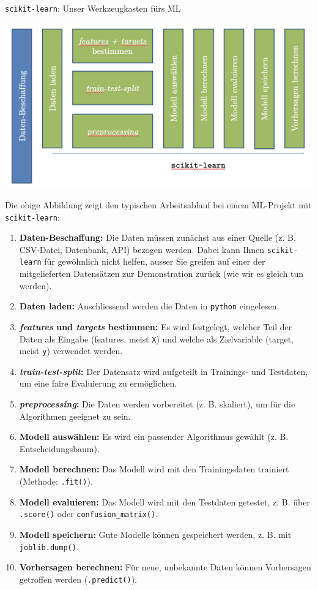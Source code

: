 \begin{lpu}{\texttt{scikit-learn}: Unser Werkzeugkasten fürs ML}
\vspace{1em}
\begin{center}
  \includegraphics[width=0.9\linewidth]{pipeline.png}
\end{center}

Die obige Abbildung zeigt den typischen Arbeitsablauf bei einem ML-Projekt mit \texttt{scikit-learn}:

\begin{enumerate}
  \item \textbf{Daten-Beschaffung:} Die Daten müssen zunächst aus einer Quelle (z. B. CSV-Datei, Datenbank, API) bezogen werden. Dabei kann Ihnen \texttt{scikit-learn} für gewöhnlich nicht helfen, ausser Sie greifen auf einer der mitgelieferten Datensätzen zur Demonstration zurück (wie wir es gleich tun werden).
  \item \textbf{Daten laden:} Anschliessend werden die Daten in \texttt{python} eingelesen.
  \item \textbf{\textit{features} und \textit{targets} bestimmen:} Es wird festgelegt, welcher Teil der Daten als Eingabe (features, meist \texttt{X}) und welche als Zielvariable (target, meist \texttt{y}) verwendet werden.
  \item \textbf{\textit{train-test-split}:} Der Datensatz wird aufgeteilt in Trainings- und Testdaten, um eine faire Evaluierung zu ermöglichen.
  \item \textbf{\textit{preprocessing}:} Die Daten werden vorbereitet (z. B. skaliert), um für die Algorithmen geeignet zu sein.
  \item \textbf{Modell auswählen:} Es wird ein passender Algorithmus gewählt (z. B. Entscheidungsbaum).
  \item \textbf{Modell berechnen:} Das Modell wird mit den Trainingsdaten trainiert (Methode: \texttt{.fit()}).
  \item \textbf{Modell evaluieren:} Das Modell wird mit den Testdaten getestet, z. B. über \texttt{.score()} oder \texttt{confusion\_matrix()}.
  \item \textbf{Modell speichern:} Gute Modelle können gespeichert werden, z. B. mit \texttt{joblib.dump()}.
  \item \textbf{Vorhersagen berechnen:} Für neue, unbekannte Daten können Vorhersagen getroffen werden (\texttt{.predict()}).
\end{enumerate}


\end{lpu}
